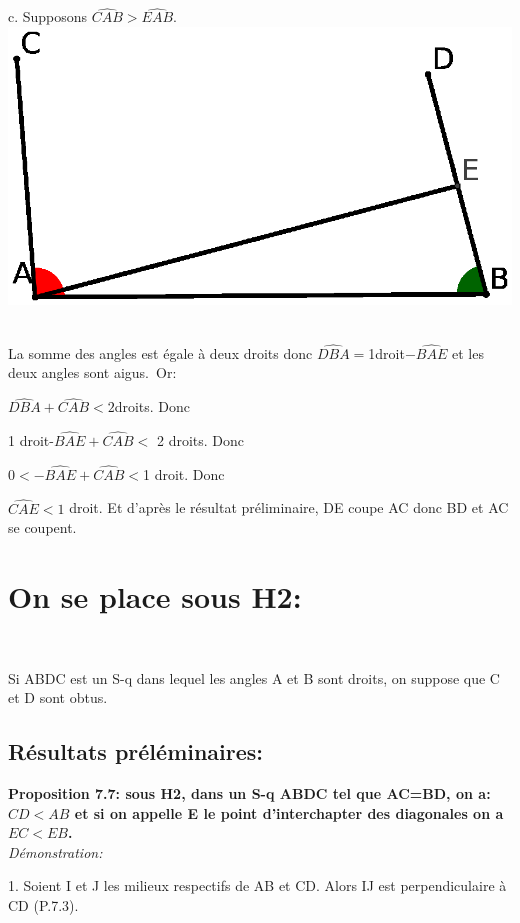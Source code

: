 \documentclass[a4paper, 12pt, twoside]{book}
\begin{document}
 c. Supposons $\hat{CAB}>\hat{EAB}$.\\
 
 
 \includegraphics[scale=0.6]{figures/saccH1b.eps} \
 

 
 La somme des angles est égale à deux droits donc $\hat{DBA}=$1droit$-\hat{BAE}$ et les deux angles sont aigus.\ Or:\
 
 $\hat{DBA}+\hat{CAB}< 2 $droits. Donc\
 
 1 droit-$\hat{BAE}+\hat{CAB}<$ 2 droits. Donc\
 
 $0<-\hat{BAE}+\hat{CAB}< $1 droit. Donc\
 
 $\hat{CAE}< 1 $ droit. Et d'après le résultat préliminaire, DE coupe AC donc BD et AC se coupent. \\
 
 
 
 \newpage  \section{On se place sous H2:}\
 
 Si ABDC est un S-q dans lequel les angles A et B sont droits, on suppose que C et D sont obtus.
  
\subsection{Résultats préléminaires:}

\textbf{ Proposition 7.7: sous H2, dans un S-q ABDC tel que AC=BD, on a:  $CD<AB$ et si on appelle E le point d'interchapter des diagonales on a $EC<EB$. }\\

\textit{Démonstration:}
 
 1. Soient I et J les milieux respectifs de AB et CD. Alors IJ est perpendiculaire à CD (P.7.3).\\
 
\end{document}
